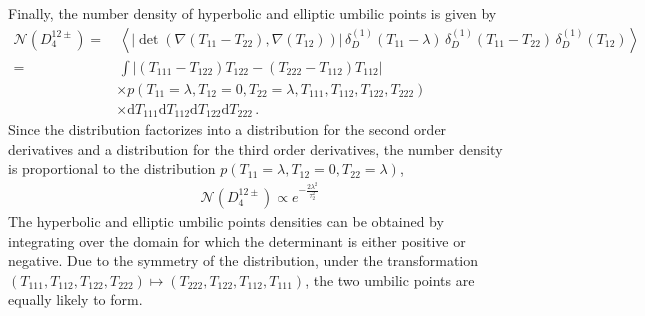 \documentclass[a4paper, 11pt]{article}
\begin{document}
Finally, the number density of hyperbolic and elliptic umbilic points is given by
\begin{align}
\mathcal{N}(D_4^{12\pm}) 
=&\, \left \langle \left|\det\left(\nabla (T_{11}-T_{22}), \nabla (T_{12})\right)\right|\, \delta_D^{(1)}(T_{11} - \lambda)\, \delta_D^{(1)}(T_{11}-T_{22})\, \delta_D^{(1)}(T_{12}) \right \rangle\nonumber\\
=&\, \int \left|(T_{111}-T_{122})T_{122} -(T_{222}-T_{112})T_{112}\right| \nonumber\\
&\times p(T_{11}=\lambda, T_{12} = 0, T_{22}=\lambda, T_{111},T_{112},T_{122},T_{222})\nonumber\\
&\times \mathrm{d}T_{111}\mathrm{d}T_{112}\mathrm{d}T_{122}\mathrm{d}T_{222}\,.
\end{align}
Since the distribution factorizes into a distribution for the second order derivatives and a distribution for the third order derivatives, the number density is proportional to the distribution $p(T_{11}=\lambda,T_{12}=0,T_{22}=\lambda)$, 
\begin{align}
\mathcal{N}(D_4^{12\pm})  \propto e^{-\frac{2 \lambda^2}{\tau_2^2}} 
\end{align}
The hyperbolic and elliptic umbilic points densities can be obtained by integrating over the domain for which the determinant is either positive or negative. Due to the symmetry of the distribution, under the transformation $(T_{111},T_{112},T_{122},T_{222})\mapsto (T_{222},T_{122},T_{112},T_{111})$,  the two umbilic points are equally likely to form.
\end{document}
